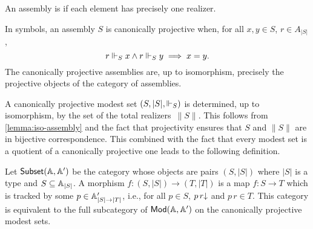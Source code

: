 
\begin{definition}
  An assembly is  if each element has
  precisely one realizer.
\end{definition}

\noindent
In symbols, an assembly $S$ is canonically projective when, for all
$x, y \in S$, $r \in A_{|S|}$,
%
\begin{equation*}
  r \rz[S] x \land r \rz[S] y \implies x = y.
\end{equation*}
%
The canonically projective assemblies are, up to isomorphism,
precisely the projective objects of the category of assemblies.

A canonically projective modest set $(S, |S|, {\rz[S]})$ is determined,
up to isomorphism, by the set of the total realizers~$\|S\|$. This
follows from \cref{lemma:iso-assembly} and the fact that
projectivity ensures that $S$ and $\|S\|$ are in bijective
correspondence. This combined with the fact that every modest set is a
quotient of a canonically projective one leads to the following
definition.

Let $\subcat{\AA, \subAA}$ be the category whose objects are pairs
$(S, |S|)$ where $|S|$ is a type and $S \subseteq \Atyp{|S|}$. A morphism
$f : (S, |S|) \to (T, |T|)$ is a map $f : S \to T$ which is tracked by
some $p \in \subAtyp{|S| \to |T|}$, i.e., for all $p \in S$,
$\defined{p\,r}$ and $p\,r \in T$. This category is equivalent to the
full subcategory of $\Mod{\AA, \subAA}$ on the canonically projective
modest sets.




